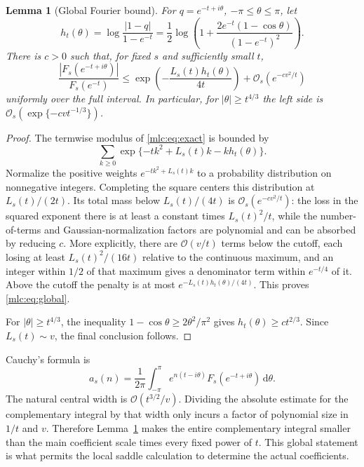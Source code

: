\documentclass[11pt]{article}
\newtheorem{lemma}[theorem]{Lemma}
\theoremstyle{remark}\newtheorem{remark}[theorem]{Remark}
\newcommand{\OO}{\mathcal O}
\newcommand{\dd}{\,\mathrm d}
\begin{document}
\begin{lemma}[Global Fourier bound]\label{mlc:lem:global}
For $q=e^{-t+i\theta}$, $-\pi\le\theta\le\pi$, let
\begin{equation}\label{mlc:eq:h}
 h_t(\theta)=\log\frac{|1-q|}{1-e^{-t}}
   =\frac12\log\left(1+\frac{2e^{-t}(1-\cos\theta)}{(1-e^{-t})^2}\right).
\end{equation}
There is $c>0$ such that, for fixed $s$ and sufficiently small $t$,
\begin{equation}\label{mlc:eq:global}
 \frac{|F_s(e^{-t+i\theta})|}{F_s(e^{-t})}
 \le \exp\!\left(-\frac{L_s(t)h_t(\theta)}{4t}\right)
                         +\OO_s(e^{-cv^2/t})
\end{equation}
uniformly over the full interval. In particular, for $|\theta|\ge t^{4/3}$ the left side is $\OO_s(\exp\{-cv t^{-1/3}\})$.
\end{lemma}
\begin{proof}
The termwise modulus of \eqref{mlc:eq:exact} is bounded by
\[
 \sum_{k\ge0}\exp\{-tk^2+L_s(t)k-kh_t(\theta)\}.
\]
Normalize the positive weights $e^{-tk^2+L_s(t)k}$ to a probability distribution on nonnegative integers. Completing the square centers this distribution at $L_s(t)/(2t)$. Its total mass below $L_s(t)/(4t)$ is $\OO_s(e^{-cv^2/t})$: the loss in the squared exponent there is at least a constant times $L_s(t)^2/t$, while the number-of-terms and Gaussian-normalization factors are polynomial and can be absorbed by reducing $c$. More explicitly, there are $\OO(v/t)$ terms below the cutoff, each losing at least $L_s(t)^2/(16t)$ relative to the continuous maximum, and an integer within $1/2$ of that maximum gives a denominator term within $e^{-t/4}$ of it. Above the cutoff the penalty is at most $e^{-L_s(t)h_t(\theta)/(4t)}$. This proves \eqref{mlc:eq:global}.

For $|\theta|\ge t^{4/3}$, the inequality $1-\cos\theta\ge2\theta^2/\pi^2$ gives $h_t(\theta)\ge c t^{2/3}$. Since $L_s(t)\sim v$, the final conclusion follows.
\end{proof}

Cauchy's formula is
\begin{equation}\label{mlc:eq:cauchy}
 a_s(n)=\frac1{2\pi}\int_{-\pi}^{\pi}
              e^{n(t-i\theta)}F_s(e^{-t+i\theta})\dd\theta.
\end{equation}
The natural central width is $\OO(t^{3/2}/v)$. Dividing the absolute estimate for the complementary integral by that width only incurs a factor of polynomial size in $1/t$ and $v$. Therefore Lemma~\ref{mlc:lem:global} makes the entire complementary integral smaller than the main coefficient scale times every fixed power of $t$. This global statement is what permits the local saddle calculation to determine the actual coefficients.
\end{document}
